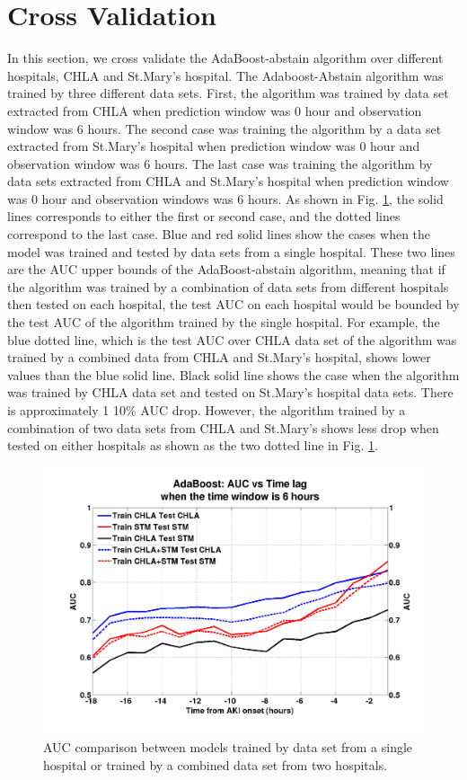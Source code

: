 \documentclass[
   technote
]{phildoc}
\newcommand{\fig}{Fig.}
\begin{document}
\section{Cross Validation}
\label{sec:cv}
In this section, we cross validate the AdaBoost-abstain algorithm over different hospitals, CHLA and St.Mary's hospital. The Adaboost-Abstain algorithm was trained by three different data sets. First, the algorithm was trained by data set extracted from CHLA when prediction window was 0 hour and observation window was 6 hours. The second case was training the algorithm by a data set extracted from St.Mary's hospital when prediction window was 0 hour and observation window was 6 hours. The last case was training the algorithm by data sets extracted from CHLA and St.Mary's hospital when prediction window was 0 hour and observation windows was 6 hours. As shown in \fig{} \ref{fig:aucVStlag}, the solid lines corresponds to either the first or second case, and the dotted lines correspond to the last case. Blue and red solid lines show the cases when the model was trained and tested by data sets from a single hospital. These two lines are the AUC upper bounds of the AdaBoost-abstain algorithm, meaning that if the algorithm was trained by a combination of data sets from different hospitals then tested on each hospital, the test AUC on each hospital would be bounded by the test AUC of the algorithm trained by the single hospital. For example, the blue dotted line, which is the test AUC over CHLA data set of the algorithm was trained by a combined data from CHLA and St.Mary's hospital, shows lower values than the blue solid line. Black solid line shows the case when the algorithm was trained by CHLA data set and tested on St.Mary's hospital data sets. There is approximately 1 10\% AUC drop. However, the algorithm trained by a combination of two data sets from CHLA and St.Mary's shows less drop when tested on either hospitals as shown as the two dotted line in \fig{} \ref{fig:aucVStlag}.

\begin{figure}[!htbp]
\centering
\includegraphics[width=\textwidth]{./figures/aucVStlag_twin006.png}
\caption{AUC comparison between models trained by data set from a single hospital or trained by a combined data set from two hospitals.} 
\label{fig:aucVStlag}      
\end{figure}
\end{document}
